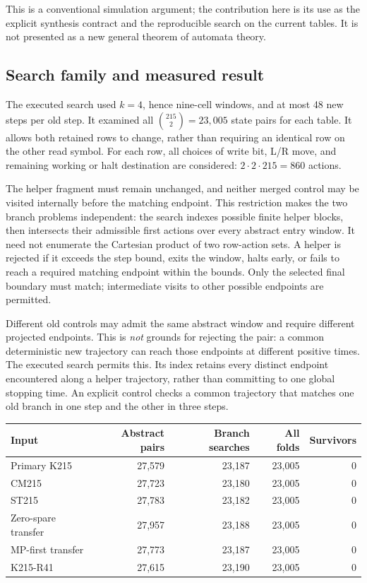 This is a conventional simulation argument; the contribution here is its
use as the explicit synthesis contract and the reproducible search on the
current tables.  It is not presented as a new general theorem of automata
theory.

\subsection{Search family and measured result}

The executed search used $k=4$, hence nine-cell windows, and at most 48
new steps per old step.  It examined all $\binom{215}{2}=23{,}005$ state
pairs for each table.  It allows both retained rows to change, rather than
requiring an identical row on the other read symbol.  For each row, all
choices of write bit, L/R move, and remaining working or halt destination
are considered: $2\cdot2\cdot215=860$ actions.

The helper fragment must remain unchanged, and neither merged control may
be visited internally before the matching endpoint.  This restriction makes
the two branch problems independent: the search indexes possible finite
helper blocks, then intersects their admissible first actions over every
abstract entry window.  It need not enumerate the Cartesian product of two
row-action sets.  A helper is rejected if it exceeds the step bound, exits
the window, halts early, or fails to reach a required matching endpoint
within the bounds. Only the selected final boundary must match; intermediate
visits to other possible endpoints are permitted.

Different old controls may admit the same abstract window and require
different projected endpoints.  This is \emph{not} grounds for rejecting the
pair: a common deterministic new trajectory can reach those endpoints at
different positive times.  The executed search permits this.  Its index
retains every distinct endpoint encountered along a helper trajectory,
rather than committing to one global stopping time.  An explicit control
checks a common trajectory that matches one old branch in one step and the
other in three steps.

\begin{center}
\begin{tabular}{lrrrr}
\hline
Input & Abstract pairs & Branch searches & All folds & Survivors\\
\hline
Primary K215 & 27,579 & 23,187 & 23,005 & 0\\
CM215 & 27,723 & 23,180 & 23,005 & 0\\
ST215 & 27,783 & 23,182 & 23,005 & 0\\
Zero-spare transfer & 27,957 & 23,188 & 23,005 & 0\\
MP-first transfer & 27,773 & 23,187 & 23,005 & 0\\
K215-R41 & 27,615 & 23,190 & 23,005 & 0\\
\hline
\end{tabular}
\end{center}

